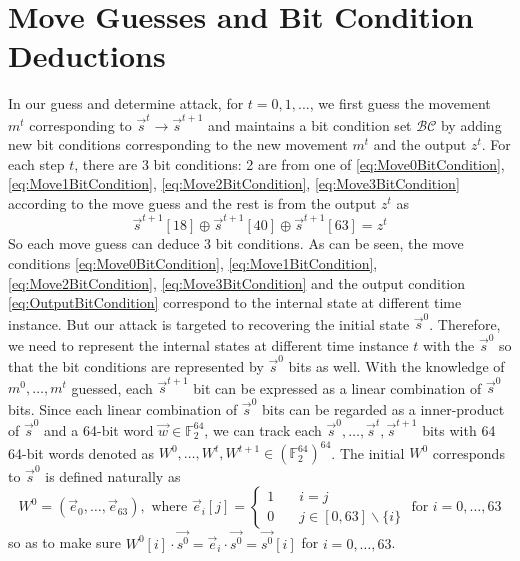 \section{Move Guesses and Bit Condition Deductions}\label{sec:OurGuessAndDetermine}
In our guess and determine attack, for $t=0,1,...$, we first guess the movement $m^t$ corresponding to $\vec{s}^t\rightarrow \vec{s}^{t+1}$ and maintains a bit condition set $\mathcal{BC}$ by adding new bit conditions corresponding to the new movement $m^t$ and the output $z^t$.
For each step $t$, there are 3 bit conditions: 2 are from one of \eqref{eq:Move0BitCondition}, \eqref{eq:Move1BitCondition}, \eqref{eq:Move2BitCondition}, \eqref{eq:Move3BitCondition} according to the move guess and the rest is from the output $z^t$ as
\begin{equation}\label{eq:OutputBitCondition}
\vec{s}^{t+1}[18]\oplus \vec{s}^{t+1}[40]\oplus \vec{s}^{t+1}[63]=z^t
\end{equation}
So each move guess can deduce 3 bit conditions.
As can be seen, the move conditions \eqref{eq:Move0BitCondition}, \eqref{eq:Move1BitCondition}, \eqref{eq:Move2BitCondition}, \eqref{eq:Move3BitCondition} and the output condition \eqref{eq:OutputBitCondition} correspond to the internal state at different time instance.
But our attack is targeted to recovering the initial state $\vec{s}^0$.
Therefore, we need to represent the internal states at different time instance $t$ with the $\vec{s}^0$ so that the bit conditions are represented by $\vec{s}^0$ bits as well.
With the knowledge of $m^0,\ldots, m^t$ guessed, each $\vec{s}^{t+1}$ bit can be expressed as a linear combination of $\vec{s}^0$ bits.
Since each linear combination of $\vec{s}^0$ bits can be regarded as a inner-product of $\vec{s}^0$ and a 64-bit word $\vec w\in \mathbb{F}_2^{64}$, we can track each $\vec{s}^0,\ldots, \vec{s}^t, \vec{s}^{t+1}$ bits with 64 64-bit words denoted as $W^0,\ldots, W^t, W^{t+1}\in (\mathbb{F}_2^{64})^{64}$.
The initial $W^0$ corresponds to $\vec{s}^0$ is defined naturally as
\begin{equation}\label{eq:W0ofS0}
  W^0=(\vec e_0, \ldots, \vec e_{63}), \text{ where } \vec e_i[j]=\left\{
  \begin{split}
     1 &\quad i=j \\
     0 &\quad j\in [0,63]\backslash\{i\}
  \end{split}
  \right.\text{ for }i=0,\ldots, 63
\end{equation}
so as to make sure $W^0[i]\cdot \vec{s^0}=\vec{e}_i\cdot \vec{s^0}=\vec{s^0}[i]$ for $i=0,\ldots, 63$.
